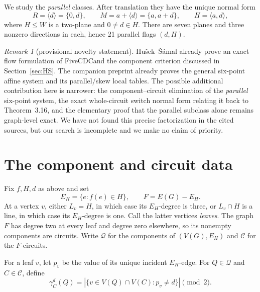 \documentclass[11pt]{article}
\theoremstyle{definition}
\theoremstyle{remark}
\newtheorem{remark}[theorem]{Remark}
\newcommand{\Q}{\mathcal Q}
\newcommand{\C}{\mathcal C}
\newcommand{\FiveCDC}{\textup{FiveCDC}}
\numberwithin{equation}{section}
\begin{document}
We study the \emph{parallel} classes.  After translation they have the
unique normal form
\begin{equation}
 R=\langle d\rangle=\{0,d\},\qquad
 M=a+\langle d\rangle=\{a,a+d\},\qquad
 H=\langle a,d\rangle,                                      \label{eq:normal}
\end{equation}
where \(H\le W\) is a two-plane and \(0\ne d\in H\).  There are seven
planes and three nonzero directions in each, hence 21 parallel flags
\((d,H)\).

\begin{remark}[provisional novelty statement]
Hu\v{s}ek--\v{S}\'amal already prove an exact flow formulation of
\FiveCDC and the component criterion discussed in
Section~\ref{sec:HS}.  The companion preprint already proves the general
six-point affine system and its parallel/skew local tables.  The possible
additional contribution here is narrower: the component--circuit
elimination of the \emph{parallel} six-point system, the exact
whole-circuit switch normal form relating it back to Theorem~3.16, and
the elementary proof that the parallel subclass alone remains graph-level
exact.  We have not found this precise factorization in the cited sources,
but our search is incomplete and we make no claim of priority.
\end{remark}

\section{The component and circuit data}

Fix \(f,H,d\) as above and set
\begin{equation}
 E_H=\{e:f(e)\in H\},\qquad F=E(G)-E_H.                     \label{eq:EH}
\end{equation}
At a vertex \(v\), either \(L_v=H\), in which case its \(E_H\)-degree is
three, or \(L_v\cap H\) is a line, in which case its \(E_H\)-degree is
one.  Call the latter vertices \emph{leaves}.  The graph \(F\) has
degree two at every leaf and degree zero elsewhere, so its nonempty
components are circuits.  Write \(\Q\) for the components of
\((V(G),E_H)\) and \(\C\) for the \(F\)-circuits.

For a leaf \(v\), let \(p_v\) be the value of its unique incident
\(E_H\)-edge.  For \(Q\in\Q\) and \(C\in\C\), define
\begin{equation}
 \gamma_C^d(Q)=
 \left|\{v\in V(Q)\cap V(C):p_v\ne d\}\right|\pmod2.         \label{eq:gamma}
\end{equation}
\end{document}
